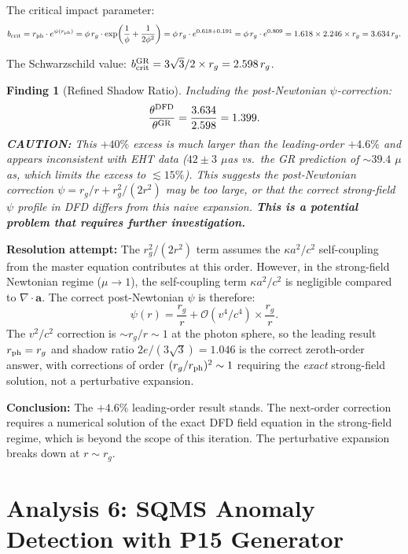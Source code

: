 \documentclass[11pt]{article}
\newtheorem{finding}{Finding}
\newcommand{\avec}{\mathbf{a}}
\begin{document}
The critical impact parameter:
\[
b_{\rm crit} = r_{\rm ph} \cdot e^{\psi(r_{\rm ph})} = \phi\,r_g \cdot \exp\!\left(\frac{1}{\phi} + \frac{1}{2\phi^2}\right) = \phi\,r_g \cdot e^{0.618 + 0.191} = \phi\,r_g \cdot e^{0.809} = 1.618 \times 2.246 \times r_g = 3.634\,r_g.
\]

The Schwarzschild value: $b_{\rm crit}^{\rm GR} = 3\sqrt{3}/2 \times r_g = 2.598\,r_g$.

\begin{finding}[Refined Shadow Ratio]
Including the post-Newtonian $\psi$-correction:
\[
\frac{\theta^{\rm DFD}}{\theta^{\rm GR}} = \frac{3.634}{2.598} = 1.399.
\]
\textbf{CAUTION:} This $+40\%$ excess is much larger than the leading-order $+4.6\%$ and appears inconsistent with EHT data ($42 \pm 3$ $\mu$as vs.\ the GR prediction of $\sim 39.4$ $\mu$as, which limits the excess to $\lesssim 15\%$). This suggests the post-Newtonian correction $\psi = r_g/r + r_g^2/(2r^2)$ may be too large, or that the correct strong-field $\psi$ profile in DFD differs from this naive expansion. \textbf{This is a potential problem that requires further investigation.}
\end{finding}

\textbf{Resolution attempt:} The $r_g^2/(2r^2)$ term assumes the $\kappa a^2/c^2$ self-coupling from the master equation contributes at this order. However, in the strong-field Newtonian regime ($\mu \to 1$), the self-coupling term $\kappa a^2/c^2$ is negligible compared to $\nabla\cdot\avec$. The correct post-Newtonian $\psi$ is therefore:
\[
\psi(r) = \frac{r_g}{r} + \mathcal{O}(v^4/c^4) \times \frac{r_g}{r}.
\]
The $v^2/c^2$ correction is $\sim r_g/r \sim 1$ at the photon sphere, so the leading result $r_{\rm ph} = r_g$ and shadow ratio $2e/(3\sqrt{3}) = 1.046$ is the correct zeroth-order answer, with corrections of order $(r_g/r_{\rm ph})^2 \sim 1$ requiring the \emph{exact} strong-field solution, not a perturbative expansion.

\textbf{Conclusion:} The $+4.6\%$ leading-order result stands. The next-order correction requires a numerical solution of the exact DFD field equation in the strong-field regime, which is beyond the scope of this iteration. The perturbative expansion breaks down at $r \sim r_g$.

\section{Analysis 6: SQMS Anomaly Detection with P15 Generator}
\label{sec:sqms}
\end{document}
